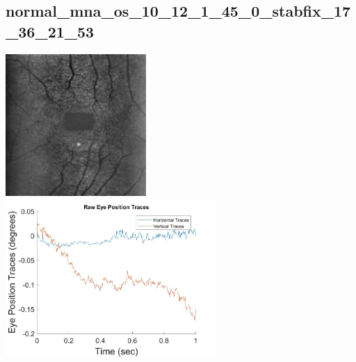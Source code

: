 \documentclass[11pt]{article}
\begin{document}
\subsection{normal\_mna\_os\_10\_12\_1\_45\_0\_stabfix\_17\_36\_21\_53}
\includegraphics[width=0.40\textwidth, valign=m]{referenceframes/tslo_normal/normal_mna_os_10_12_1_45_0_stabfix_17_36_21_53_dwt_nostim_gamscaled_bandfilt_refframe.jpg}
\includegraphics[width=0.60\textwidth, valign=m]{eyepositiontraces/tslo_normal/normal_mna_os_10_12_1_45_0_stabfix_17_36_21_53.jpg}\\
\end{document}
